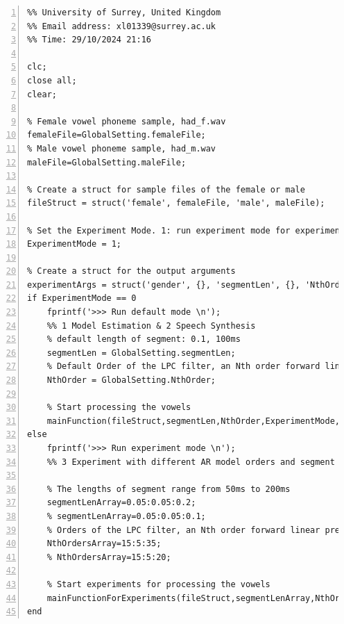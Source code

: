 \documentclass{article}
\begin{document}
\begin{lstlisting}[frame=single, numbers=left, style=Matlab-editor, caption={main.m}, label={lst:main}]
%% Author: Xiaoguang Liang (PG/T - Comp Sci & Elec Eng)
%% University of Surrey, United Kingdom
%% Email address: xl01339@surrey.ac.uk
%% Time: 29/10/2024 21:16

clc;
close all;
clear;

% Female vowel phoneme sample, had_f.wav
femaleFile=GlobalSetting.femaleFile; 
% Male vowel phoneme sample, had_m.wav
maleFile=GlobalSetting.maleFile;

% Create a struct for sample files of the female or male
fileStruct = struct('female', femaleFile, 'male', maleFile);

% Set the Experiment Mode. 1: run experiment mode for experiments; 0: run default mode for mainFunction with default parameters
ExperimentMode = 1;

% Create a struct for the output arguments
experimentArgs = struct('gender', {}, 'segmentLen', {}, 'NthOrder', {}, 'H', {}, 'W', {}, 'formantFrequencies', {}, 'Y', {}, 'frequencyVector', {});
if ExperimentMode == 0
    fprintf('>>> Run default mode \n');
    %% 1 Model Estimation & 2 Speech Synthesis
    % default length of segment: 0.1, 100ms
    segmentLen = GlobalSetting.segmentLen;
    % Default Order of the LPC filter, an Nth order forward linear predictor
    NthOrder = GlobalSetting.NthOrder;
  
    % Start processing the vowels
    mainFunction(fileStruct,segmentLen,NthOrder,ExperimentMode,experimentArgs);
else
    fprintf('>>> Run experiment mode \n');
    %% 3 Experiment with different AR model orders and segment lengths. Notice: Part 1 and 2 are included in the mainFunction()

    % The lengths of segment range from 50ms to 200ms
    segmentLenArray=0.05:0.05:0.2;
    % segmentLenArray=0.05:0.05:0.1;
    % Orders of the LPC filter, an Nth order forward linear predictor, range from 15 to 35
    NthOrdersArray=15:5:35;
    % NthOrdersArray=15:5:20;

    % Start experiments for processing the vowels
    mainFunctionForExperiments(fileStruct,segmentLenArray,NthOrdersArray,ExperimentMode,experimentArgs);
end
\end{lstlisting}
\end{document}
